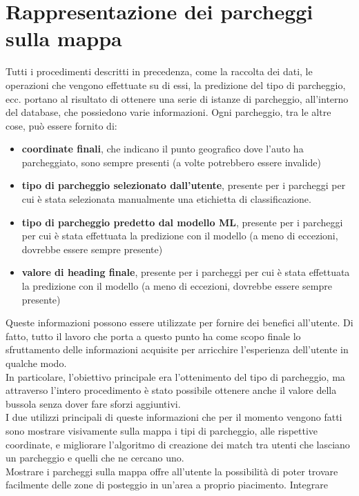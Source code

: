 \chapter{Rappresentazione dei parcheggi sulla mappa}

Tutti i procedimenti descritti in precedenza, come la raccolta dei dati, le
operazioni che vengono effettuate su di essi, la predizione del tipo di 
parcheggio, ecc. portano al risultato di ottenere una serie di istanze
di parcheggio, all'interno del database, che possiedono varie informazioni.
Ogni parcheggio, tra le altre cose, può essere fornito di:
\begin{itemize}
    \item \textbf{coordinate finali}, che indicano il punto geografico dove l'auto ha 
    parcheggiato, sono sempre presenti (a volte potrebbero essere invalide)
    \item \textbf{tipo di parcheggio selezionato dall'utente}, presente per i parcheggi
    per cui è stata selezionata manualmente una etichietta di classificazione.
    \item \textbf{tipo di parcheggio predetto dal modello ML}, presente per i parcheggi
    per cui è stata effettuata la predizione con il modello (a meno di eccezioni, dovrebbe
    essere sempre presente)
    \item \textbf{valore di heading finale}, presente per i parcheggi
    per cui è stata effettuata la predizione con il modello (a meno di eccezioni, dovrebbe
    essere sempre presente)
\end{itemize}
Queste informazioni possono essere utilizzate per fornire dei benefici all'utente.
Di fatto, tutto il lavoro che porta a questo punto ha come scopo finale lo 
sfruttamento delle informazioni acquisite per arricchire l'esperienza 
dell'utente in qualche modo.\\
In particolare, l'obiettivo principale era l'ottenimento del tipo di parcheggio, ma 
attraverso l'intero procedimento è stato possibile ottenere anche il valore della 
bussola senza dover fare sforzi aggiuntivi.\\
I due utilizzi principali di queste informazioni che per il momento vengono fatti sono
mostrare visivamente sulla mappa i tipi di parcheggio, alle rispettive coordinate, e
migliorare l'algoritmo di creazione dei match tra utenti che lasciano un parcheggio e 
quelli che ne cercano uno.\\
Mostrare i parcheggi sulla mappa offre all'utente la possibilità di poter trovare 
facilmente delle zone di posteggio in un'area a proprio piacimento. Integrare
